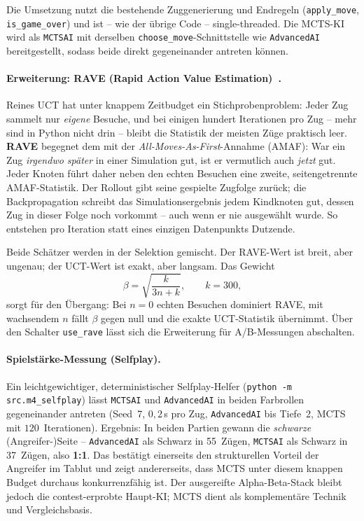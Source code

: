 \documentclass[11pt,a4paper]{article}
\newcommand{\code}[1]{\texttt{\small #1}}
\begin{document}
Die Umsetzung nutzt die bestehende Zuggenerierung und Endregeln
(\code{apply\_move}, \code{is\_game\_over}) und ist -- wie der \"ubrige Code --
single-threaded.
Die MCTS-KI wird als \code{MCTSAI} mit derselben \code{choose\_move}-Schnittstelle
wie \code{AdvancedAI} bereitgestellt, sodass beide direkt gegeneinander antreten
k\"onnen.

\paragraph{Erweiterung: RAVE (Rapid Action Value Estimation)~\cite{browne2012}.}
Reines UCT hat unter knappem Zeitbudget ein Stichprobenproblem: Jeder Zug
sammelt nur \emph{eigene} Besuche, und bei einigen hundert Iterationen pro Zug
-- mehr sind in Python nicht drin -- bleibt die Statistik der meisten Z\"uge
praktisch leer.
\textbf{RAVE} begegnet dem mit der \emph{All-Moves-As-First}-Annahme (AMAF):
War ein Zug \emph{irgendwo sp\"ater} in einer Simulation gut, ist er
vermutlich auch \emph{jetzt} gut.
Jeder Knoten f\"uhrt daher neben den echten Besuchen eine zweite,
seitengetrennte AMAF-Statistik.
Der Rollout gibt seine gespielte Zugfolge zur\"uck; die Backpropagation
schreibt das Simulationsergebnis jedem Kindknoten gut, dessen Zug in dieser
Folge noch vorkommt -- auch wenn er nie ausgew\"ahlt wurde.
So entstehen pro Iteration statt eines einzigen Datenpunkts Dutzende.

Beide Sch\"atzer werden in der Selektion gemischt.
Der RAVE-Wert ist breit, aber ungenau; der UCT-Wert ist exakt, aber langsam.
Das Gewicht
\[
  \beta = \sqrt{\frac{k}{3n + k}}, \qquad k = 300,
\]
sorgt f\"ur den \"Ubergang: Bei $n = 0$ echten Besuchen dominiert RAVE, mit
wachsendem $n$ f\"allt $\beta$ gegen null und die exakte UCT-Statistik
\"ubernimmt.
\"Uber den Schalter \code{use\_rave} l\"asst sich die Erweiterung f\"ur
A/B-Messungen abschalten.

\paragraph{Spielst\"arke-Messung (Selfplay).}
Ein leichtgewichtiger, deterministischer Selfplay-Helfer
(\code{python -m src.m4\_selfplay}) l\"asst \code{MCTSAI} und \code{AdvancedAI}
in beiden Farbrollen gegeneinander antreten
(Seed~7, $0{,}2$\,s pro Zug, \code{AdvancedAI} bis Tiefe~2, MCTS mit
$120$~Iterationen).
Ergebnis: In beiden Partien gewann die \emph{schwarze} (Angreifer-)Seite --
\code{AdvancedAI} als Schwarz in 55~Z\"ugen, \code{MCTSAI} als Schwarz in
37~Z\"ugen, also \textbf{1:1}.
Das best\"atigt einerseits den strukturellen Vorteil der Angreifer im Tablut und
zeigt andererseits, dass MCTS unter diesem knappen Budget durchaus
konkurrenzf\"ahig ist.
Der ausgereifte Alpha-Beta-Stack bleibt jedoch die contest-erprobte Haupt-KI;
MCTS dient als komplement\"are Technik und Vergleichsbasis.
\end{document}
